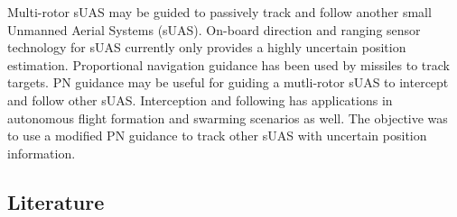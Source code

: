 \documentclass[conference]{IEEEtran}
\providecommand{\DIFdelbegin}{} %
\providecommand{\DIFdelend}{} %
\newcommand{\DIFscaledelfig}{0.5}
\newlength{\DIFdelgraphicswidth} %
\newlength{\DIFdelgraphicsheight} %
\newcommand{\DIFdelincludegraphics}[2][]{%
\sbox{\DIFdelgraphicsbox}{\DIFOincludegraphics[#1]{#2}}%
\settoboxwidth{\DIFdelgraphicswidth}{\DIFdelgraphicsbox} %
\settoboxtotalheight{\DIFdelgraphicsheight}{\DIFdelgraphicsbox} %
\scalebox{\DIFscaledelfig}{%
\parbox[b]{\DIFdelgraphicswidth}{\usebox{\DIFdelgraphicsbox}\\[-\baselineskip] \rule{\DIFdelgraphicswidth}{0em}}\llap{\resizebox{\DIFdelgraphicswidth}{\DIFdelgraphicsheight}{%
\setlength{\unitlength}{\DIFdelgraphicswidth}%
\begin{picture}(1,1)%
\thicklines\linethickness{2pt} %
{\color[rgb]{1,0,0}\put(0,0){\framebox(1,1){}}}%
{\color[rgb]{1,0,0}\put(0,0){\line( 1,1){1}}}%
{\color[rgb]{1,0,0}\put(0,1){\line(1,-1){1}}}%
\end{picture}%
}\hspace*{3pt}}} %
} %
\DeclareRobustCommand{\DIFdelbegin}{\DIFOdelbegin \let\includegraphics\DIFdelincludegraphics} %
\DeclareRobustCommand{\DIFdelend}{\DIFOaddend \let\includegraphics\DIFOincludegraphics} %
\begin{document}
\DIFdelbegin %

\DIFdelend Multi-rotor sUAS may be guided to passively track and follow another small Unmanned Aerial Systems (sUAS). On-board direction and ranging sensor technology for sUAS currently only provides a highly uncertain position estimation. Proportional navigation guidance has been used by missiles to track targets. PN guidance may be useful for guiding a mutli-rotor sUAS to intercept and follow other sUAS. Interception and following has applications in autonomous flight formation and swarming scenarios as well. The objective was to use a modified PN guidance to track other sUAS with uncertain position information.


\subsection{Literature}
\DIFdelbegin %




\end{document}
